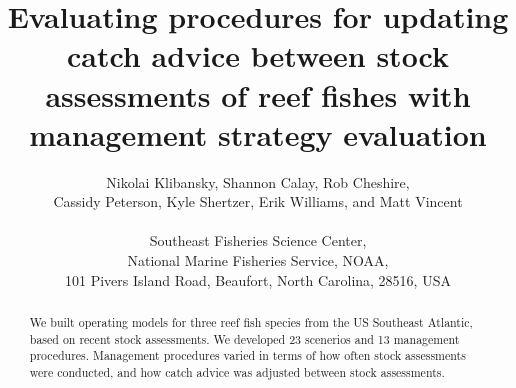 \documentclass[12pt,english]{article}
\begin{document}







\title{Evaluating procedures for updating catch advice between stock assessments of reef fishes with management strategy evaluation}
\author{Nikolai Klibansky,  Shannon Calay, Rob Cheshire,\\
Cassidy Peterson, Kyle Shertzer, Erik Williams, and Matt Vincent\\\\
Southeast Fisheries Science Center, \\
National Marine Fisheries Service, NOAA,\\
101 Pivers Island Road, Beaufort, North Carolina, 28516, USA}
\maketitle

\begin{abstract}
We built operating models for three reef fish species from the US Southeast Atlantic, based on recent stock assessments. We developed 23 scenerios and 13 management procedures. Management procedures varied in terms of how often stock assessments were conducted, and how catch advice was adjusted between stock assessments.

\end{abstract}
\end{document}
